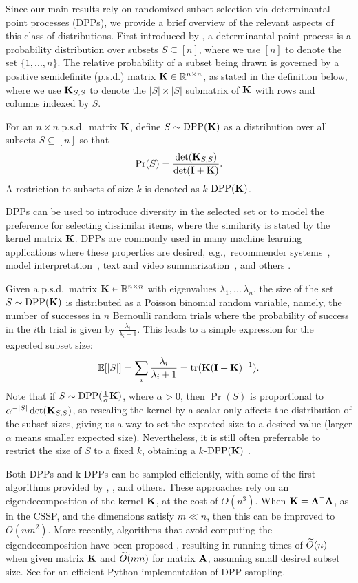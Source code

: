\documentclass{article}
\begin{document}
Since our main results rely on randomized subset selection via
determinantal point processes (DPPs), we provide a brief overview of
the relevant aspects of this class of distributions.
First introduced by \citet{Macchi1975}, a determinantal point process is a
probability distribution over subsets $S \subseteq[n]$, where we use $[n]$
to denote the set $\{1,...,n\}$. The relative probability of a subset being drawn is 
governed by a positive semidefinite (p.s.d.) matrix $\mathbf K \in \mathbb R^{n\times n}$,
as stated in the definition below, where we use $\mathbf K_{S,S}$ to denote
the $|S|\times |S|$ submatrix of $\mathbf K$ with rows and columns indexed
by $S$.
\begin{definition}\label{d:dpp}
  For an $n\times n$ p.s.d.~matrix $\mathbf K$, define $S\sim
  {\mathrm{DPP}}(\mathbf K)$ as a distribution 
  over all subsets $S\subseteq [n]$ so
  that
  \[\mathrm{Pr}(S)=\frac{\det(\mathbf K_{S,S})}{\det(\mathbf I+\mathbf K)}.\]
A restriction to subsets of size $k$ is denoted as $k$-${\mathrm{DPP}}(\mathbf K)$.
\end{definition}
DPPs can be used to introduce diversity in the selected set or to
model the preference for selecting dissimilar items, where the
similarity is stated by the kernel matrix $\mathbf K$. DPPs are
commonly used in many machine learning applications where these
properties are desired, e.g.,~recommender systems~\citep{Warlop2019}, model
interpretation~\citep{kim:2016MMD}, text
and video summarization~\citep{dpp-video}, and others
\citep{dpp-ml}. 

Given a p.s.d.~matrix $\mathbf K \in \mathbb R^{n \times n}$ with eigenvalues
$\lambda_1,...\, \lambda_n$, the size of the set $S \sim {\mathrm{DPP}}(\mathbf K)$
is distributed as a Poisson binomial random variable, namely, the
number of successes in $n$ Bernoulli random trials where the
probability of success in the $i$th trial is given by 
$\frac{\lambda_i}{\lambda_i+1}$. This leads to a simple
expression for the expected subset size:
\begin{align}
\mathbb E[|S|] = \sum_i \frac{\lambda_i}{\lambda_i + 1} = \mathrm{tr}(\mathbf K(\mathbf I + \mathbf K)^{-1}).\label{eq:size}
\end{align}
Note that if $S\sim{\mathrm{DPP}}(\frac1\alpha\mathbf K)$, where $\alpha>0$, then
$\Pr(S)$ is proportional to $\alpha^{-|S|}\det(\mathbf K_{S,S})$, so rescaling the kernel
by a scalar only affects the distribution of the subset sizes, giving
us a way to set the expected size to a desired value (larger $\alpha$
means smaller expected size).
Nevertheless, it is still often preferrable to restrict the size of
$S$ to a fixed $k$, obtaining a $k$-${\mathrm{DPP}}(\mathbf K)$ \citep{k-dpp}.

Both DPPs and k-DPPs can be sampled efficiently, with some of the
first algorithms provided by
\citet{dpp-independence},
\citet{efficient-volume-sampling}, \citet{k-dpp} and others. These
approaches rely on an eigendecomposition of the kernel $\mathbf K$, at the cost of $O(n^3)$. When
$\K=\A^\top\A$, as in the CSSP, and the dimensions satisfy $m\ll n$, then this can be improved
to $O(nm^2)$. More recently, algorithms that avoid computing the
eigendecomposition have been proposed
\citep{rayleigh-mcmc,dpp-sublinear,dpp-intermediate},
resulting in running times of $\widetilde{O}(n)$ when given matrix $\mathbf K$ and
$\widetilde{O}(nm)$ for matrix $\mathbf A$, assuming small desired subset size.
See \citet{dppy} for an efficient Python implementation of DPP sampling.
\end{document}
